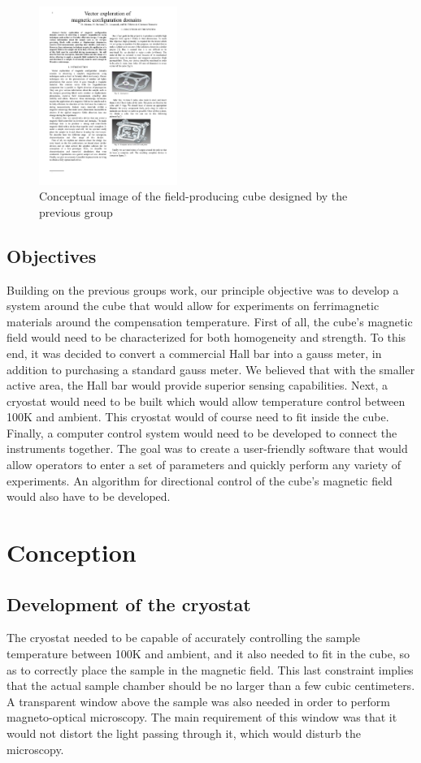 \documentclass[journal]{IEEEtran}
\begin{document}
\begin{figure}[h]
\centering
\includegraphics[width=0.4\textwidth]{cube}
\caption{Conceptual image of the field-producing cube designed by the previous group}
\label{f cube}
\end{figure}

\subsection{Objectives}
Building on the previous groups work, our principle objective was to develop a system around the cube that would allow for experiments on ferrimagnetic materials around the compensation temperature. First of all, the cube's magnetic field would need to be characterized for both homogeneity and strength. To this end, it was decided to convert a commercial Hall bar into a gauss meter, in addition to purchasing a standard gauss meter. We believed that with the smaller active area, the Hall bar would provide superior sensing capabilities. Next, a cryostat would need to be built which would allow temperature control between 100K and ambient. This cryostat would of course need to fit inside the cube. Finally, a computer control system would need to be developed to connect the instruments together. The goal was to create a user-friendly software that would allow operators to enter a set of parameters and quickly perform any variety of experiments. An algorithm for directional control of the cube's magnetic field would also have to be developed. 



\section{Conception}
\subsection{Development of the cryostat}
The cryostat needed to be capable of accurately controlling the sample temperature between 100K and ambient, and it also needed to fit in the cube, so as to correctly place the sample in the magnetic field. This last constraint implies that the actual sample chamber should be no larger than a few cubic centimeters. A transparent window above the sample was also needed in order to perform magneto-optical microscopy. The main requirement of this window was that it would not distort the light passing through it, which would disturb the microscopy.
\end{document}
